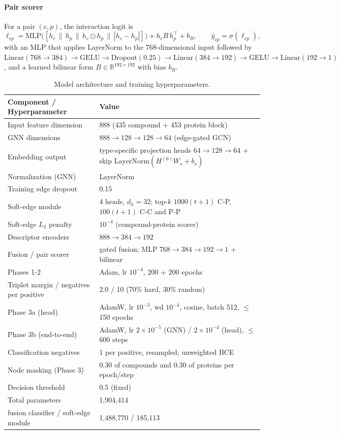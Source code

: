 \documentclass[11pt,letterpaper]{article}
\begin{document}
\paragraph{Pair scorer}
For a pair $(c,p)$, the interaction logit is
\[
\ell_{cp} = \mathrm{MLP}\big([h_c\,\|\,h_p\,\|\,h_c\odot h_p\,\|\,|h_c-h_p|]\big) + h_c B\, h_p^{\top} + b_B,
\qquad \hat{y}_{cp}=\sigma(\ell_{cp}),
\]
with an MLP that applies LayerNorm to the 768-dimensional input followed by $\mathrm{Linear}(768\to384)\to\mathrm{GELU}\to\mathrm{Dropout}(0.25)\to\mathrm{Linear}(384\to192)\to\mathrm{GELU}\to\mathrm{Linear}(192\to1)$, and a learned bilinear form $B\in\mathbb{R}^{192\times192}$ with bias $b_B$.

\begin{table}[!h]
\centering
\caption{Model architecture and training hyperparameters.}
\label{tab:architecture}
\begin{tabularx}{\textwidth}{l X}
\toprule
\textbf{Component / Hyperparameter} & \textbf{Value} \\
\midrule
Input feature dimension & 888 (435 compound + 453 protein block) \\
GNN dimensions & $888\to128\to128\to64$ (edge-gated GCN) \\
Embedding output & type-specific projection heads $64\to128\to64$ + skip $\mathrm{LayerNorm}(H^{(0)}W_s+b_s)$ \\
Normalization (GNN) & LayerNorm \\
Training edge dropout & 0.15 \\
Soft-edge module & 4 heads, $d_h=32$; top-$k$ $1000(t+1)$ C-P, $100(t+1)$ C-C and P-P \\
Soft-edge $L_2$ penalty & $10^{-4}$ (compound-protein scorer) \\
Descriptor encoders & $888\to384\to192$ \\
Fusion / pair scorer & gated fusion; MLP $768\to384\to192\to1$ + bilinear \\
\midrule
Phases 1-2 & Adam, lr $10^{-4}$, 200 + 200 epochs \\
Triplet margin / negatives per positive & 2.0 / 10 (70\% hard, 30\% random) \\
Phase 3a (head) & AdamW, lr $10^{-3}$, wd $10^{-4}$, cosine, batch 512, $\leq$150 epochs \\
Phase 3b (end-to-end) & AdamW, lr $2\!\times\!10^{-5}$ (GNN) / $2\!\times\!10^{-4}$ (head), $\leq$600 steps \\
Classification negatives & 1 per positive, resampled; unweighted BCE \\
Node masking (Phase 3) & 0.30 of compounds and 0.30 of proteins per epoch/step \\
Decision threshold & 0.5 (fixed) \\
Total parameters & 1,904,414 \\
\quad fusion classifier / soft-edge module & 1,488,770 / 185,113 \\
\bottomrule
\end{tabularx}
\end{table}
\end{document}
